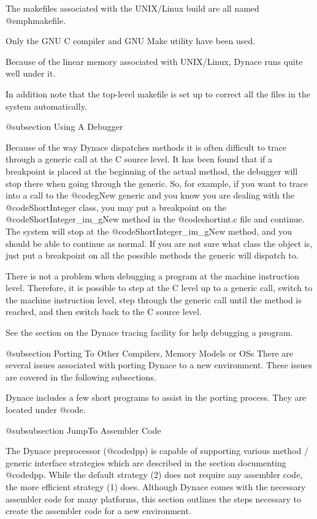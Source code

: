 The makefiles associated with the UNIX/Linux build are all named @emph{makefile}.

Only the GNU C compiler and GNU Make utility have been used.

Because of the linear memory associated with UNIX/Linux, Dynace runs quite well under it.

In addition note that the top-level makefile is set up to correct
all the files in the system automatically.

@subsection Using A Debugger

Because of the way Dynace dispatches methods it is often difficult to
trace through a generic call at the C source level.  It has been found
that if a breakpoint is placed at the beginning of the actual method,
the debugger will stop there when going through the generic.  So, for
example, if you want to trace into a call to the @code{gNew} generic and
you know you are dealing with the @code{ShortInteger} class, you may put
a breakpoint on the @code{ShortInteger_im_gNew} method in the
@code{shortint.c} file and continue.  The system will stop at the
@code{ShortInteger_im_gNew} method, and you should be able to continue as
normal.  If you are not sure what class the object is, just put a breakpoint
on all the possible methods the generic will dispatch to.

There is not a problem when debugging a program at the machine instruction
level.  Therefore, it is possible to step at the C level up to a generic
call, switch to the machine instruction level, step through the generic
call until the method is reached, and then switch back to the C source
level.


See the section on the Dynace tracing facility for help debugging
a program.



@subsection Porting To Other Compilers, Memory Models or OSs
There are several issues associated with porting Dynace to a new
environment.  These issues are covered in the following subsections.

Dynace includes a few short programs to assist in the porting process.
They are located under @code{\DYNACE\KERNEL\PORT}.


@subsubsection JumpTo Assembler Code

The Dynace preprocessor (@code{dpp}) is capable of supporting various
method / generic interface strategies which are described in the section
documenting @code{dpp}.  While the default strategy (2) does not require
any assembler code, the more efficient strategy (1) does.  Although
Dynace comes with the necessary assembler code for many platforms, this
section outlines the steps necessary to create the assembler code for a
new environment.

